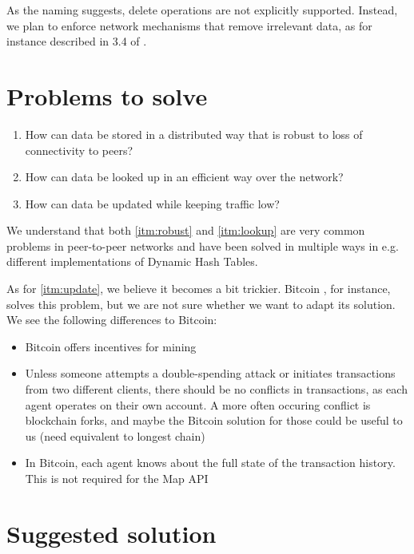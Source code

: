 \documentclass[a4paper, 10pt, conference]{ieeeconf}
\begin{document}
As the naming suggests, delete operations are not explicitly supported. Instead,
we plan to enforce network mechanisms that remove irrelevant data, as for
instance described in 3.4 of \cite{freenet}.

\section{Problems to solve}

\begin{enumerate}
  \itemsep0em
  \item \label{itm:robust} How can data be stored in a distributed way that is
    robust to loss of connectivity to peers?
  \item \label{itm:lookup} How can data be looked up in an efficient way over
    the network?
  \item \label{itm:update} How can data be updated while keeping traffic low?
\end{enumerate}

We understand that both \ref{itm:robust} and \ref{itm:lookup} are very common
problems in peer-to-peer networks and have been solved in multiple ways in
e.g. different implementations of Dynamic Hash Tables.

As for \ref{itm:update}, we believe it becomes a bit trickier. Bitcoin 
\cite{bitcoin}, for instance, solves this problem, but we are not sure whether
we want to adapt its solution. We see the following differences to Bitcoin:

\begin{itemize}
  \itemsep0em
  \item Bitcoin offers incentives for mining
  \item Unless someone attempts a double-spending attack or initiates
    transactions from two different clients, there should be no conflicts in
    transactions, as each agent operates on their own account. A more often 
    occuring conflict is blockchain forks, and maybe the Bitcoin solution for 
    those could be useful to us (need equivalent to longest chain)
  \item In Bitcoin, each agent knows about the full state of the transaction
    history. This is not required for the Map API
\end{itemize}

\section{Suggested solution}
\end{document}
